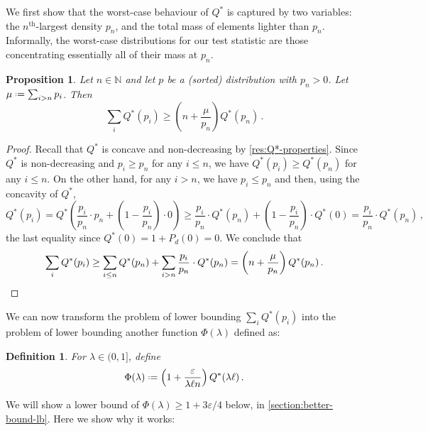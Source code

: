 \documentclass[10pt,a4paper]{article}
\newtheorem{proposition}{Proposition}[section]
\newtheorem{definition}{Definition}[section]
\newcommand*{\define}{\mathrel{\vcenter{\baselineskip0.5ex \lineskiplimit0pt
                      \hbox{\scriptsize.}\hbox{\scriptsize.}}}%
                      =}
\newcommand{\bN}{\ensuremath{\mathbb{N}}}
\renewcommand{\epsilon}{\varepsilon}
\begin{document}
We first show that the worst-case behaviour of $Q^*$ is captured by two variables: the
$n^\text{th}$-largest density $p_n$, and the total mass of elements lighter than $p_n$. Informally,
the worst-case distributions for our test statistic are those concentrating essentially all of their
mass at $p_n$.

\begin{proposition}
    \label{res:Q*-worst-case}
    Let $n \in \bN$ and let $p$ be a (sorted) distribution with $p_n > 0$. Let $\mu \define \sum_{i
    > n} p_i$. Then
    \[
        \sum_i Q^*(p_i) \ge \left(n + \frac{\mu}{p_n}\right) Q^*(p_n) \,.
    \]
\end{proposition}
\begin{proof}
    Recall that $Q^*$ is concave and non-decreasing by \cref{res:Q*-properties}. Since $Q^*$ is
    non-decreasing and $p_i \ge p_n$ for any $i \le n$, we have $Q^*(p_i) \ge Q^*(p_n)$ for any $i
    \le n$. On the other hand, for any $i > n$, we have $p_i \le p_n$ and then, using the concavity
    of $Q^*$,
    \[
        Q^*(p_i)
        = Q^*\left( \frac{p_i}{p_n} \cdot p_n + \left(1-\frac{p_i}{p_n}\right) \cdot 0 \right)
        \ge \frac{p_i}{p_n} \cdot Q^*(p_n) + \left(1-\frac{p_i}{p_n}\right) \cdot Q^*(0)
        = \frac{p_i}{p_n} \cdot Q^*(p_n) \,,
    \]
    the last equality since $Q^*(0) = 1 + P_d(0) = 0$. We conclude that
    \[
        \sum_i Q^*(p_i)
        \ge \sum_{i \le n} Q^*(p_n) + \sum_{i > n} \frac{p_i}{p_n} \cdot Q^*(p_n)
        = \left(n + \frac{\mu}{p_n}\right) Q^*(p_n) \,. \qedhere
    \]
\end{proof}

We can now transform the problem of lower bounding $\sum_i Q^*(p_i)$ into the problem of lower
bounding another function $\Phi(\lambda)$ defined as:

\begin{definition}
For $\lambda \in (0,1]$, define
\[
  \Phi(\lambda) \define \left(1 + \frac{\epsilon}{\lambda \ell n}\right) Q^*(\lambda \ell) \,.
\]
\end{definition}

We will show a lower bound of $\Phi(\lambda) \geq 1+3\epsilon/4$ below, in
\cref{section:better-bound-lb}. Here we show why it works:
\end{document}
